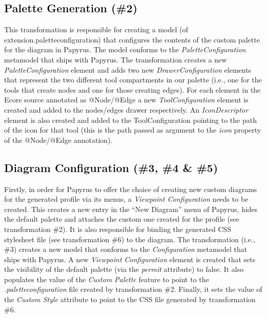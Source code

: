 

\subsection{Palette Generation (\#2)}
\label{sec:paletteGeneration}
This transformation is responsible for creating a model (of extension.paletteconfiguration) that configures the contents of the custom palette for 
the diagram in Papyrus. 
The model conforms to the \textit{PaletteConfiguration} metamodel that ships with Papyrus. 
The transformation creates a new \textit{PaletteConfiguration} element and adds two new \textit{DrawerConfiguration} elements that represent the two different tool compartments in our palette (i.e., one for the tools that create nodes and one for those creating edges). 
For each element in the Ecore source annotated as @Node/@Edge a new \textit{ToolConfiguration} element is created and added to the nodes/edges drawer respectively. 
An \textit{IconDescriptor} element is also created and added to the ToolConfiguration pointing to the path of the icon for that tool (this is the path passed as argument to the \textit{icon} property of the @Node/@Edge annotation).

\subsection{Diagram Configuration (\#3, \#4 \& \#5)}
\label{sec:diagramConfiguration}
Firstly, in order for Papyrus to offer the choice of creating new custom diagrams for the generated profile via its menus, a \textit{Viewpoint Configuration} needs to be created. 
This creates a new entry in the ``New Diagram'' menu of Papyrus, hides the default palette and attaches the custom one created for the profile (see transformation \#2). 
It is also responsible for binding the generated CSS stylesheet file (see transformation \#6) to the diagram. 
The transformation (i.e., \#3) creates a new model that conforms to the \textit{Configuration} metamodel that ships with Papyrus. 
A new \textit{Viewpoint Configuration} element is created that sets the visibility of the default palette (via the \textit{permit} attribute) to false. 
It also populates the value of the \textit{Custom Palette} feature to point to the \emph{.paletteconfiguration} file created by transformation \#2. Finally, it sets the value of the \textit{Custom Style} attribute to point to the CSS file generated by transformation \#6.

